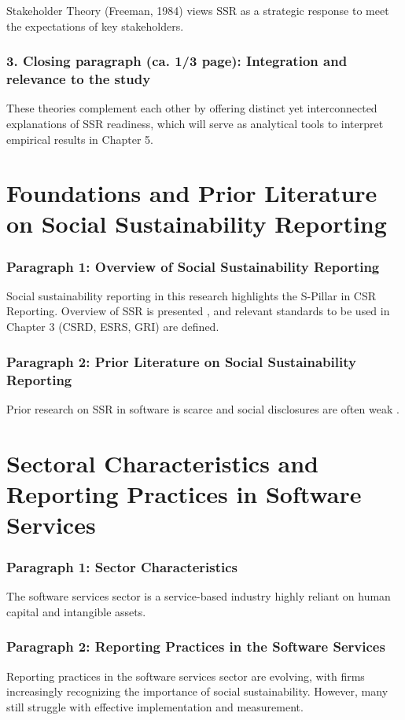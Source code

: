 Stakeholder Theory (Freeman, 1984) views SSR as a strategic response to meet the expectations of key stakeholders.

\subsubsection{3. Closing paragraph (ca. 1/3 page): Integration and relevance to the study}

These theories complement each other by offering distinct yet interconnected explanations of SSR readiness, 
which will serve as analytical tools to interpret empirical results in Chapter 5.

\section{Foundations and Prior Literature on Social Sustainability Reporting}

\subsubsection{Paragraph 1: Overview of Social Sustainability Reporting}
Social sustainability reporting in this research highlights the S-Pillar in CSR Reporting.
Overview of SSR is presented \parencite{Edge2022,Fiechter2022}, and relevant standards to be 
used in Chapter 3 (CSRD, ESRS, GRI) are defined.

\subsubsection{Paragraph 2: Prior Literature on Social Sustainability Reporting}
Prior research on SSR in software is scarce \parencite{Ye2020,Afshari2022} and 
social disclosures are often weak \parencite{Christensen2021,Reitmaier2024}.


\section{Sectoral Characteristics and Reporting Practices in Software Services}

\subsubsection{Paragraph 1: Sector Characteristics}
The software services sector is a service-based industry highly reliant on human capital and intangible assets.

\subsubsection{Paragraph 2: Reporting Practices in the Software Services}
Reporting practices in the software services sector are evolving, with firms increasingly recognizing 
the importance of social sustainability. However, many still struggle with effective implementation and measurement.

